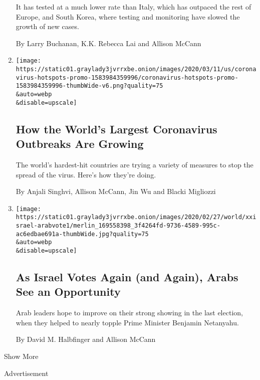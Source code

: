 \begin{enumerate}
  It has tested at a much lower rate than Italy, which has outpaced the
  rest of Europe, and South Korea, where testing and monitoring have
  slowed the growth of new cases.

  By Larry Buchanan, K.K. Rebecca Lai and Allison McCann
\item
  \href{/interactive/2020/world/coronavirus-maps-italy-iran-korea.html}{}

  \texttt{[image: https://static01.graylady3jvrrxbe.onion/images/2020/03/11/us/coronavirus-hotspots-promo-1583984359996/coronavirus-hotspots-promo-1583984359996-thumbWide-v6.png?quality=75\\\&auto=webp\\\&disable=upscale]}

  \hypertarget{how-the-worlds-largest-coronavirus-outbreaks-are-growing}{%
  \subsection{How the World's Largest Coronavirus Outbreaks Are
  Growing}\label{how-the-worlds-largest-coronavirus-outbreaks-are-growing}}

  The world's hardest-hit countries are trying a variety of measures to
  stop the spread of the virus. Here's how they're doing.

  By Anjali Singhvi, Allison McCann, Jin Wu and Blacki Migliozzi
\item
  \href{/2020/02/28/world/middleeast/israel-arabs-election-vote.html}{}

  \texttt{[image: https://static01.graylady3jvrrxbe.onion/images/2020/02/27/world/xxisrael-arabvote1/merlin\_169558398\_3f4264fd-9736-4589-995c-ac6edbae691a-thumbWide.jpg?quality=75\\\&auto=webp\\\&disable=upscale]}

  \hypertarget{as-israel-votes-again-and-again-arabs-see-an-opportunity}{%
  \subsection{As Israel Votes Again (and Again), Arabs See an
  Opportunity}\label{as-israel-votes-again-and-again-arabs-see-an-opportunity}}

  Arab leaders hope to improve on their strong showing in the last
  election, when they helped to nearly topple Prime Minister Benjamin
  Netanyahu.

  By David M. Halbfinger and Allison McCann
\end{enumerate}

Show More

Advertisement

